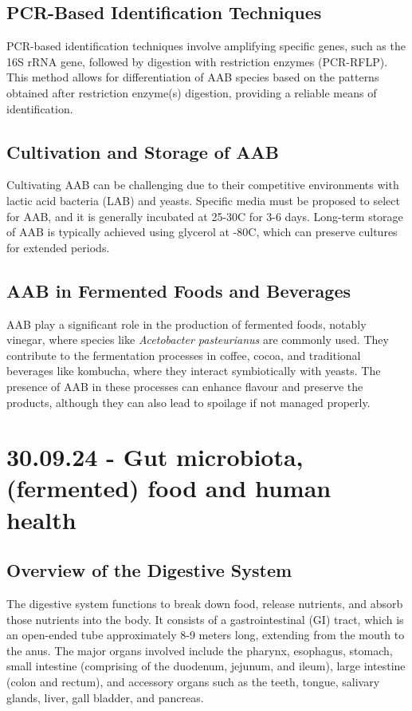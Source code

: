 \subsection{PCR-Based Identification Techniques} 
PCR-based identification techniques involve amplifying specific genes, such as the 16S rRNA gene, followed by digestion with restriction enzymes (PCR-RFLP). This method allows for differentiation of AAB species based on the patterns obtained after restriction enzyme(s) digestion, providing a reliable means of identification.

\subsection{Cultivation and Storage of AAB} 
Cultivating AAB can be challenging due to their competitive environments with lactic acid bacteria (LAB) and yeasts. Specific media must be proposed to select for AAB, and it is generally incubated at 25-30\textdegree C for 3-6 days. Long-term storage of AAB is typically achieved using glycerol at -80\textdegree C, which can preserve cultures for extended periods.

\subsection{AAB in Fermented Foods and Beverages} 
AAB play a significant role in the production of fermented foods, notably vinegar, where species like \textit{Acetobacter pasteurianus} are commonly used. They contribute to the fermentation processes in coffee, cocoa, and traditional beverages like kombucha, where they interact symbiotically with yeasts. The presence of AAB in these processes can enhance flavour and preserve the products, although they can also lead to spoilage if not managed properly.

\section{30.09.24 - Gut microbiota, (fermented) food and human health}
\subsection{Overview of the Digestive System} 
The digestive system functions to break down food, release nutrients, and absorb those nutrients into the body. It consists of a gastrointestinal (GI) tract, which is an open-ended tube approximately 8-9 meters long, extending from the mouth to the anus. The major organs involved include the pharynx, esophagus, stomach, small intestine (comprising of the duodenum, jejunum, and ileum), large intestine (colon and rectum), and accessory organs such as the teeth, tongue, salivary glands, liver, gall bladder, and pancreas.

